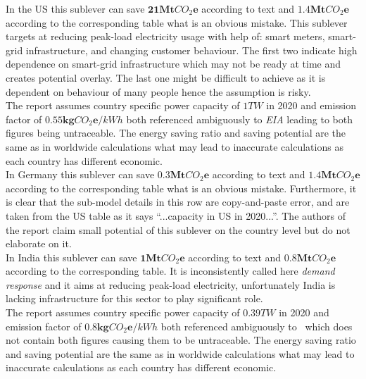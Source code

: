 \documentclass[11pt, twocolumn]{article}
\begin{document}
In the US this sublever can save $\mathbf{21} \mathbf{Mt}CO_2\mathbf{e}$ according to text and $\mathbf{1.4} \mathbf{Mt}CO_2\mathbf{e}$ according to the corresponding table what is an obvious mistake. This sublever targets at reducing peak-load electricity usage with help of: smart meters, smart-grid infrastructure, and changing customer behaviour. The first two indicate high dependence on smart-grid infrastructure which may not be ready at time and creates potential overlay. The last one might be difficult to achieve as it is dependent on behaviour of many people hence the assumption is risky.\\
The report assumes country specific power capacity of $1 TW$ in 2020 and emission factor of $\mathbf{0.55} \mathbf{kg}CO_2\mathbf{e} / kWh$ both referenced ambiguously to \emph{EIA} leading to both figures being untraceable. The energy saving ratio and saving potential are the same as in worldwide calculations what may lead to inaccurate calculations as each country has different economic.\\

In Germany this sublever can save $\mathbf{0.3} \mathbf{Mt}CO_2\mathbf{e}$ according to text and $\mathbf{1.4} \mathbf{Mt}CO_2\mathbf{e}$ according to the corresponding table what is an obvious mistake. Furthermore, it is clear that the sub-model details in this row are copy-and-paste error, and are taken from the US table as it says ``...capacity in US in 2020...''. The authors of the report claim small potential of this sublever on the country level but do not elaborate on it.\\

In India this sublever can save $\mathbf{1} \mathbf{Mt}CO_2\mathbf{e}$ according to text and $\mathbf{0.8} \mathbf{Mt}CO_2\mathbf{e}$ according to the corresponding table. It is inconsistently called here \emph{demand response} and it aims at reducing peak-load electricity, unfortunately India is lacking infrastructure for this sector to play significant role.\\
The report assumes country specific power capacity of $0.39 TW$ in 2020 and emission factor of $\mathbf{0.8} \mathbf{kg}CO_2\mathbf{e} / kWh$ both referenced ambiguously to~\citep{grid2008green} which does not contain both figures causing them to be untraceable. The energy saving ratio and saving potential are the same as in worldwide calculations what may lead to inaccurate calculations as each country has different economic.\\
\end{document}
